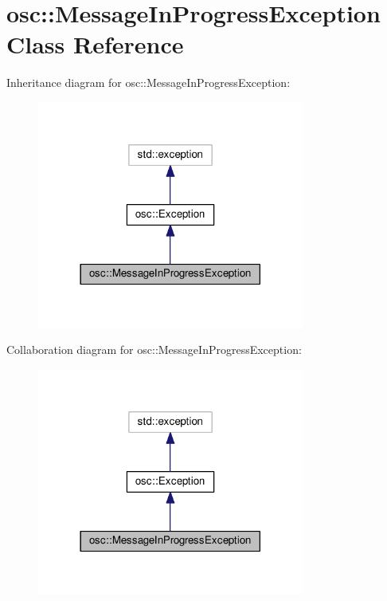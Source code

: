 \hypertarget{classosc_1_1_message_in_progress_exception}{}\section{osc\+:\+:Message\+In\+Progress\+Exception Class Reference}
\label{classosc_1_1_message_in_progress_exception}


Inheritance diagram for osc\+:\+:Message\+In\+Progress\+Exception\+:\nopagebreak
\begin{figure}[H]
\begin{center}
\leavevmode
\includegraphics[width=249pt]{classosc_1_1_message_in_progress_exception__inherit__graph}
\end{center}
\end{figure}


Collaboration diagram for osc\+:\+:Message\+In\+Progress\+Exception\+:\nopagebreak
\begin{figure}[H]
\begin{center}
\leavevmode
\includegraphics[width=249pt]{classosc_1_1_message_in_progress_exception__coll__graph}
\end{center}
\end{figure}
